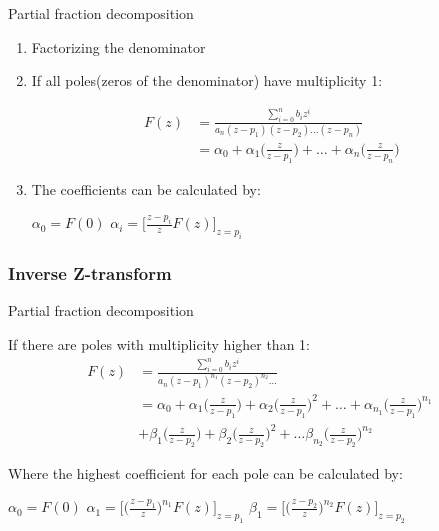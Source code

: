 \begin{frame}
	\begin{block}{Partial fraction decomposition}
		\begin{enumerate}
			\item Factorizing the denominator
			\item If all poles(zeros of the denominator) have multiplicity 1:
			\vspace{-2 em}

				\begin{align*}
				F(z) &= \frac{\sum\limits_{i=0}^{n} b_i z^{i}}{a_n(z-p_1)(z-p_2) \dots (z-p_n)}\\
				&= \alpha_0 + \alpha_1 \bigg(\frac{z}{z-p_1}\bigg)  + \dots + \alpha_n \bigg(\frac{z}{z-p_n}\bigg)
				\end{align*}
			
			\item The coefficients can be calculated by:\\
			\begin{center}
				$\alpha_0 = F(0)$ \quad		$\alpha_i = \bigg[\frac{z-p_i}{z} F(z)\bigg]_{z=p_i}$
			\end{center}
			\setcounter{enumTemp}{\theenumi}
		\end{enumerate}
	\end{block}
\end{frame}
\begin{frame}
	\frametitle{Inverse Z-transform}
	\begin{block}{Partial fraction decomposition}
			\begin{enumerate}
				\setcounter{enumi}{\theenumTemp}
				\footnotesize{
				\item If there are poles with multiplicity higher than 1:
				\vspace{-1.25em}
					\begin{align*}
						F(z) & = \frac{\sum\limits_{i=0}^{n} b_i z^{i}}{a_n(z-p_1)^{n_1}(z-p_2)^{n_2} \dots}\\
						& = \alpha_0 + \alpha_1\bigg(\frac{z}{z-p_1}\bigg) + \alpha_2\bigg(\frac{z}{z-p_1}\bigg)^{2} + \dots + \alpha_{n_1}\bigg(\frac{z}{z-p_1}\bigg)^{n_1} \\
						& + \beta_1 \bigg(\frac{z}{z-p_2}\bigg) + \beta_2 \bigg(\frac{z}{z-p_2}\bigg)^{2} + \dots \beta_{n_2} \bigg(\frac{z}{z-p_2}\bigg)^{n_2}
					\end{align*}
					\item Where the highest coefficient for each pole can be calculated by:
					\begin{center}
						$ \alpha_0 = F(0)$ 		$\alpha_1 = \Bigg[\bigg(\frac{z-p_1}{z}\bigg)^{n_1}F(z)\Bigg]_{z=p_1}$ 	 $\beta_1 = \Bigg[\bigg(\frac{z-p_2}{z}\bigg)^{n_2}F(z)\Bigg]_{z=p_2}$
					\end{center}}
					\setcounter{enumTmp}{\theenumi}
				\end{enumerate}
	\end{block}

\end{frame}
